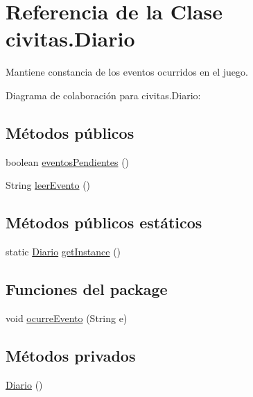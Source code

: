 \hypertarget{classcivitas_1_1Diario}{}\section{Referencia de la Clase civitas.\+Diario}
\label{classcivitas_1_1Diario}


Mantiene constancia de los eventos ocurridos en el juego.  




Diagrama de colaboración para civitas.\+Diario\+:
\subsection*{Métodos públicos}
\begin{DoxyCompactItemize}
\item 
boolean \hyperlink{classcivitas_1_1Diario_a4947b72bc28e0ec2ad1746cb4c46b31c}{eventos\+Pendientes} ()
\item 
String \hyperlink{classcivitas_1_1Diario_af109f3660de1846cafd7770d01f35457}{leer\+Evento} ()
\end{DoxyCompactItemize}
\subsection*{Métodos públicos estáticos}
\begin{DoxyCompactItemize}
\item 
static \hyperlink{classcivitas_1_1Diario}{Diario} \hyperlink{classcivitas_1_1Diario_af8e36f90afe1bbaf252205f467b33750}{get\+Instance} ()
\end{DoxyCompactItemize}
\subsection*{Funciones del \textquotesingle{}package\textquotesingle{}}
\begin{DoxyCompactItemize}
\item 
void \hyperlink{classcivitas_1_1Diario_a7267b21dad18f09ad950d57043d24462}{ocurre\+Evento} (String e)
\end{DoxyCompactItemize}
\subsection*{Métodos privados}
\begin{DoxyCompactItemize}
\item 
\hyperlink{classcivitas_1_1Diario_aa1dad77c65d0c353a8f17353ea5f10aa}{Diario} ()
\end{DoxyCompactItemize}
